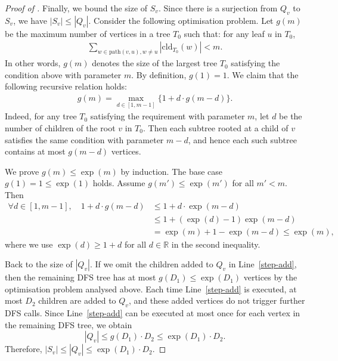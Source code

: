\documentclass[11pt]{amsart}
\theoremstyle{definition}
\theoremstyle{remark}
\begin{document}
\begin{proof}[Proof of ]

Finally, we bound the size of $S_v$. Since there is a surjection from $Q_v$ to $S_v$, we have $|S_v| \leq |Q_v|$. 
Consider the following optimisation problem.
Let $g(m)$ be the maximum number of vertices in a tree $T_0$ such that: 
for any leaf $u$ in $T_0$, 
\begin{align*}
  \sum_{w\in \text{path}(v,u),w\neq u}|\text{cld}_{T_0}(w)| < m.
\end{align*} 
In other words, $g(m)$ denotes the size of the largest tree $T_0$ satisfying the condition above with parameter $m$. By definition, $g(1) = 1$.
We claim that the following recursive relation holds:
\begin{align*}
    g(m) =\max_{d\in [1,m-1]} \{1 + d\cdot g(m-d)\}.
\end{align*}
Indeed, for any tree $T_0$ satisfying the requirement with parameter $m$, let $d$ be the number of children of the root $v$ in $T_0$. Then each subtree rooted at a child of $v$ satisfies the same condition with parameter $m-d$, and hence each such subtree contains at most $g(m-d)$ vertices.

We prove $g(m)\leq \exp(m)$ by induction. The base case $g(1) = 1 \leq \exp(1)$ holds. Assume $g(m') \leq \exp(m')$ for all $m' < m$. Then
\begin{align*}
 \forall d \in [1,m-1], \quad  1+d \cdot g(m-d) &\leq 1 + d\cdot \exp(m-d)\\
&\leq 1+(\exp(d)-1)\exp(m-d)\\
&= \exp(m) + 1 - \exp(m-d) \leq \exp(m),
\end{align*}
where we use $\exp(d) \geq 1 + d$ for all $d\in \mathbb{R}$ in the second inequality.

Back to the size of $|Q_v|$.
If we omit the children added to $Q_v$ in Line~\ref{step-add}, then the remaining DFS tree has at most $g(D_1) \leq \exp(D_1)$ vertices by the optimisation problem analysed above. 
Each time Line~\ref{step-add} is executed, at most $D_2$ children are added to $Q_v$, and these added vertices do not trigger further DFS calls. Since Line~\ref{step-add} can be executed at most once for each vertex in the remaining DFS tree, we obtain
\[
|Q_v| \leq g(D_1)\cdot D_2 \leq \exp(D_1)\cdot D_2.
\]
Therefore, $|S_v| \leq |Q_v| \leq \exp(D_1)\cdot D_2$.
\end{proof}
\end{document}

